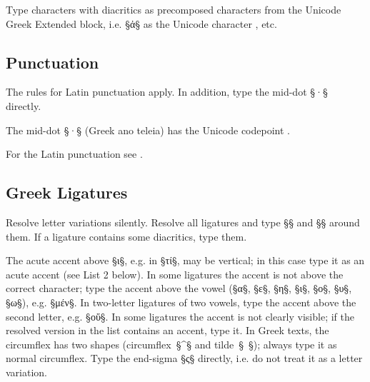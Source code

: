 \begin{clarification}
Type characters with diacritics as precomposed characters from the Unicode Greek Extended block, i.e. §ἀ§ as the Unicode character , etc.
\end{clarification}


\tocspace
\subsection{Punctuation}
\label{section greek punctuation}

\begin{mainrule}
The rules for Latin punctuation apply. In addition, type the mid-dot §·§ directly.
\end{mainrule}

\begin{clarification}
The mid-dot §·§ (Greek ano teleia) has the Unicode codepoint .
\end{clarification}

\begin{crossref}
For the Latin punctuation see .
\end{crossref}


\tocspace
\subsection{Greek Ligatures}
\label{section greek ligatures}

\begin{mainrule}
Resolve letter variations silently. Resolve all ligatures and type §{§ and §}§ around them. If a ligature contains some diacritics, type them.
\end{mainrule}

\begin{clarification}
The acute accent above §ι§, e.g. in §{τί}§, may be vertical; in this case type it as an acute accent (see List 2 below). In some ligatures the accent is not above the correct character; type the accent above the vowel (§α§, §ε§, §η§, §ι§, §ο§, §υ§, §ω§), e.g. §{μέν}§. In two-letter ligatures of two vowels, type the accent above the second letter, e.g. §{οὕ}§. In some ligatures the accent is not clearly visible; if the resolved version in the list contains an accent, type it. In Greek texts, the circumflex has two shapes (circumflex~§^§ and tilde~§~§); always type it as normal circumflex. Type the end-sigma §ς§ directly, i.e. do not treat it as a letter variation.
\end{clarification}

